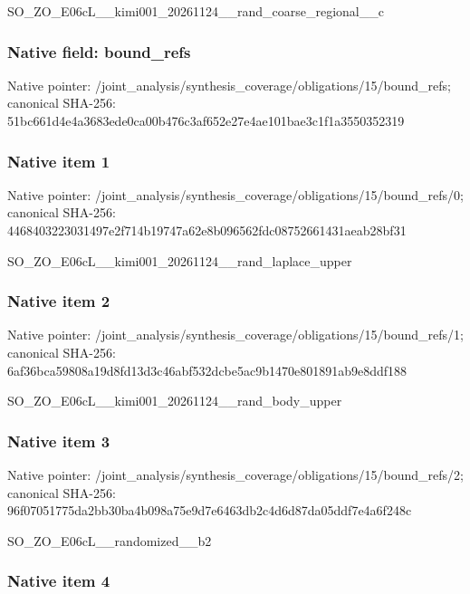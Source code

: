 \documentclass[10pt,a4paper]{article}
\begin{document}
SO\_ZO\_E06cL\_\_kimi001\_202\allowbreak{}61124\_\_rand\_coarse\_regio\allowbreak{}nal\_\_c


\subsubsection{Native field: bound\_refs}


Native pointer: /joint\_analysis/synthesi\allowbreak{}s\_coverage/obligations/1\allowbreak{}5/bound\_refs; canonical SHA-256: 51bc661d4e4a3683ede0ca00\allowbreak{}b476c3af652e27e4ae101bae\allowbreak{}3c1f1a3550352319



\subsubsection{Native item 1}


Native pointer: /joint\_analysis/synthesi\allowbreak{}s\_coverage/obligations/1\allowbreak{}5/bound\_refs/0; canonical SHA-256: 4468403223031497e2f714b1\allowbreak{}9747a62e8b096562fdc08752\allowbreak{}661431aeab28bf31


SO\_ZO\_E06cL\_\_kimi001\_202\allowbreak{}61124\_\_rand\_laplace\_uppe\allowbreak{}r


\subsubsection{Native item 2}


Native pointer: /joint\_analysis/synthesi\allowbreak{}s\_coverage/obligations/1\allowbreak{}5/bound\_refs/1; canonical SHA-256: 6af36bca59808a19d8fd13d3\allowbreak{}c46abf532dcbe5ac9b1470e8\allowbreak{}01891ab9e8ddf188


SO\_ZO\_E06cL\_\_kimi001\_202\allowbreak{}61124\_\_rand\_body\_upper


\subsubsection{Native item 3}


Native pointer: /joint\_analysis/synthesi\allowbreak{}s\_coverage/obligations/1\allowbreak{}5/bound\_refs/2; canonical SHA-256: 96f07051775da2bb30ba4b09\allowbreak{}8a75e9d7e6463db2c4d6d87d\allowbreak{}a05ddf7e4a6f248c


SO\_ZO\_E06cL\_\_randomized\_\_b2


\subsubsection{Native item 4}
\end{document}
